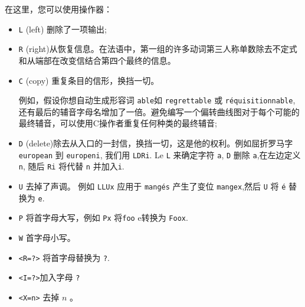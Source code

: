 在这里，您可以使用操作器：


\begin{itemize}
\item \verb+L+ (left) 删除了一项输出;
  	  
\item \verb+R+ (right)从恢复信息。在法语中，第一组的许多动词第三人称单数除去不定式和从端部在改变信结合第四个最终的信息。
  	  
\item \verb+C+ (copy) 重复条目的信形，换挡一切。
  	  
例如，假设你想自动生成形容词
\verb+able+如 \verb+regrettable+ 或 \verb+réquisitionnable+,
 还有最后的辅音字母名增加了一倍。避免编写一个偏转曲线图对于每个可能的最终辅音，可以使用C操作者重复任何种类的最终辅音;
  
  \item \verb+D+ (delete)除去从入口的一封信，换挡一切，这是他的权利。例如屈折罗马字 \verb+european+ 到 \verb+europeni+, 我们用 \verb+LDRi+. Le \verb+L+ 来确定字符 \verb+a+, \verb+D+ 删除 \verb+a+,在左边定义 \verb+n+, 随后 \verb+Ri+ 将代替 \verb+n+
并加入\verb+i+.

\item \verb+U+ 去掉了声调。
	例如 \verb+LLUx+ 应用于
	\texttt{mangés} 产生了变位 \verb+mangex+,然后 \verb+U+
	将 \texttt{é} 替换为 \verb+e+.

\item \verb+P+ 将首字母大写，例如
	\verb$Px$ 将\verb$foo$ e转换为 \verb$Foox$.
  
\item \verb+W+ 首字母小写。

\item \verb+<R=?>+ 将首字母替换为 \verb+?+.

\item \verb+<I=?>+加入字母 \verb+?+

\item \verb+<X=n>+ 去掉 $n$ 。
\end{itemize}


